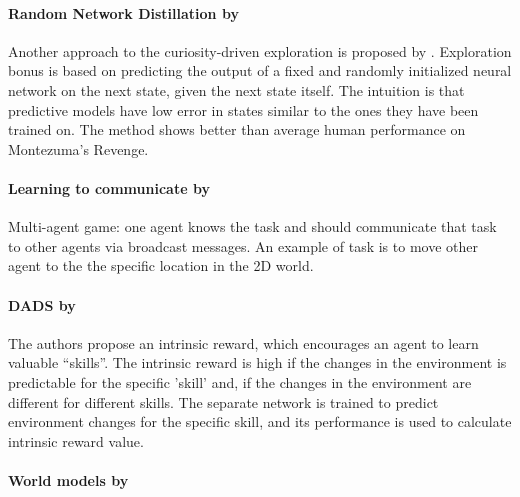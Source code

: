 \documentclass[acmsmall, nonacm]{acmart}
\begin{document}
\paragraph{Random Network Distillation by~\citet{burda_exploration_2019}} %
\label{par:random_distillation}

Another approach to the curiosity-driven exploration is proposed by \citep{burda_exploration_2019}. Exploration bonus is based on predicting the output of a fixed and randomly initialized neural network on the next state, given the next state itself. The intuition is that predictive models have low error in states similar to the ones they have been trained on. The method shows better than average human performance on Montezuma’s Revenge.


\paragraph{Learning to communicate by~\citet{Mordatch2018EmergenceOG}} %
\label{par:learning_tom_communicate}

Multi-agent game: one agent knows the task and should communicate that task to other agents via broadcast messages. An example of task is to move other agent to the the specific location in the 2D world.


\paragraph{DADS by~\citet{Sharma2020DynamicsAwareUD}} %
\label{par:dads}

The authors propose an intrinsic reward, which encourages an agent to learn valuable ``skills''. The intrinsic reward is high if the changes in the environment is predictable for the specific 'skill' and, if the changes in the environment are different for different skills. The separate network is trained to predict environment changes for the specific skill, and its performance is used to calculate intrinsic reward value.


\paragraph{World models by~\citet{ha_recurrent_2018}} %
\label{par:world_models}
\end{document}
